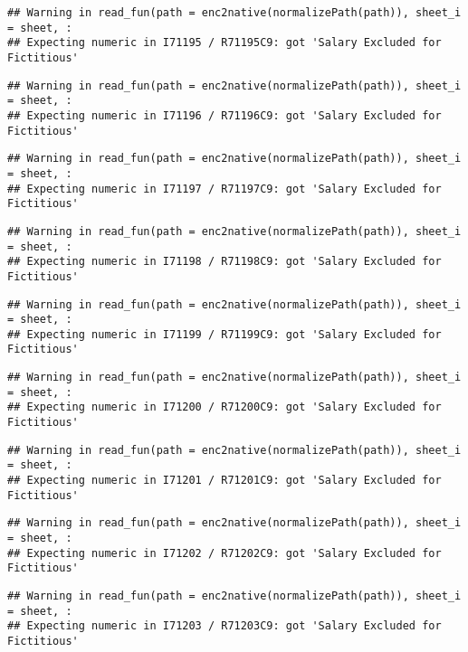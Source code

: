 \documentclass[
]{article}
\begin{document}
\begin{verbatim}
## Warning in read_fun(path = enc2native(normalizePath(path)), sheet_i = sheet, :
## Expecting numeric in I71195 / R71195C9: got 'Salary Excluded for Fictitious'
\end{verbatim}

\begin{verbatim}
## Warning in read_fun(path = enc2native(normalizePath(path)), sheet_i = sheet, :
## Expecting numeric in I71196 / R71196C9: got 'Salary Excluded for Fictitious'
\end{verbatim}

\begin{verbatim}
## Warning in read_fun(path = enc2native(normalizePath(path)), sheet_i = sheet, :
## Expecting numeric in I71197 / R71197C9: got 'Salary Excluded for Fictitious'
\end{verbatim}

\begin{verbatim}
## Warning in read_fun(path = enc2native(normalizePath(path)), sheet_i = sheet, :
## Expecting numeric in I71198 / R71198C9: got 'Salary Excluded for Fictitious'
\end{verbatim}

\begin{verbatim}
## Warning in read_fun(path = enc2native(normalizePath(path)), sheet_i = sheet, :
## Expecting numeric in I71199 / R71199C9: got 'Salary Excluded for Fictitious'
\end{verbatim}

\begin{verbatim}
## Warning in read_fun(path = enc2native(normalizePath(path)), sheet_i = sheet, :
## Expecting numeric in I71200 / R71200C9: got 'Salary Excluded for Fictitious'
\end{verbatim}

\begin{verbatim}
## Warning in read_fun(path = enc2native(normalizePath(path)), sheet_i = sheet, :
## Expecting numeric in I71201 / R71201C9: got 'Salary Excluded for Fictitious'
\end{verbatim}

\begin{verbatim}
## Warning in read_fun(path = enc2native(normalizePath(path)), sheet_i = sheet, :
## Expecting numeric in I71202 / R71202C9: got 'Salary Excluded for Fictitious'
\end{verbatim}

\begin{verbatim}
## Warning in read_fun(path = enc2native(normalizePath(path)), sheet_i = sheet, :
## Expecting numeric in I71203 / R71203C9: got 'Salary Excluded for Fictitious'
\end{verbatim}
\end{document}
